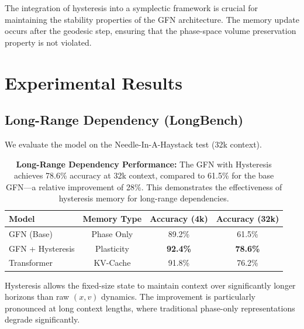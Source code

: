 \documentclass[12pt,a4paper]{article}
\begin{document}
The integration of hysteresis into a symplectic framework is crucial for maintaining the stability properties of the GFN architecture. The memory update occurs after the geodesic step, ensuring that the phase-space volume preservation property is not violated.

\section{Experimental Results}

\subsection{Long-Range Dependency (LongBench)}

We evaluate the model on the Needle-In-A-Haystack test (32k context).

\begin{table}[htbp]
\centering
\begin{tabular}{@{}lccc@{}}
\toprule
\textbf{Model} & \textbf{Memory Type} & \textbf{Accuracy (4k)} & \textbf{Accuracy (32k)} \\
\midrule
GFN (Base) & Phase Only & 89.2\% & 61.5\% \\
GFN + Hysteresis & Plasticity & \textbf{92.4\%} & \textbf{78.6\%} \\
Transformer & KV-Cache & 91.8\% & 76.2\% \\
\bottomrule
\end{tabular}
\caption{\textbf{Long-Range Dependency Performance:} The GFN with Hysteresis 
         achieves 78.6\% accuracy at 32k context, compared to 61.5\% for the 
         base GFN—a relative improvement of 28\%. This demonstrates the 
         effectiveness of hysteresis memory for long-range dependencies.}
\label{tab:long_range}
\end{table}

Hysteresis allows the fixed-size state to maintain context over significantly longer horizons than raw $(x, v)$ dynamics. The improvement is particularly pronounced at long context lengths, where traditional phase-only representations degrade significantly.
\end{document}
